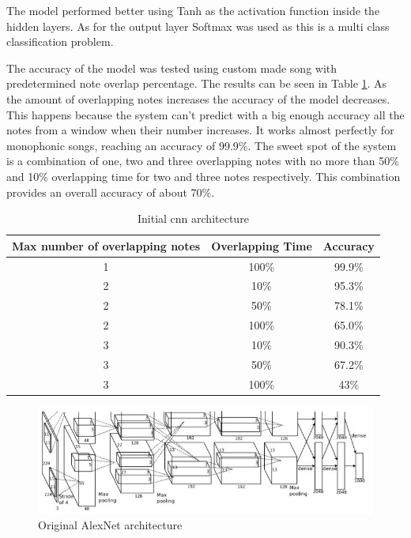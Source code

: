 The model performed better using Tanh as the activation function inside the hidden layers. As for the output layer Softmax was used as this is a multi class classification problem.

\par
The accuracy of the model was tested using custom made song with predetermined note overlap percentage. 
The results can be seen in Table \ref{table:results}. As the amount of overlapping notes increases the accuracy of the model decreases. This happens because the system can't predict with a big enough accuracy all the notes from a window when their number increases. It works almost perfectly for monophonic songs, reaching an accuracy of 99.9\%. The sweet spot of the system is a combination of one, two and three overlapping notes with no more than 50\% and 10\% overlapping time for two and three notes respectively. This combination provides an overall accuracy of about 70\%.

\begin{table} [H]
	\centering
	\caption{Initial cnn architecture}
	\begin{tabular}{ |c|c|c|} 
		\hline
		Max number of overlapping notes & Overlapping Time & Accuracy\\ \hline
		1 & 100\% & 99.9\%  \\ \hline
		2 & 10\% & 95.3\% \\ \hline
		2 & 50\% & 78.1\% \\ \hline
		2 & 100\% & 65.0\% \\ \hline
		3 & 10\% & 90.3\% \\ \hline
		3 & 50\% & 67.2\% \\ \hline
		3 & 100\% & 43\% \\ \hline				
	\end{tabular}
	\label{table:results}
\end{table}

\begin{figure}[H]
	\caption[AlexNet Architecture]{ Original AlexNet architecture \cite{alexnet}}
	\centering
	\label{fig:alexnet}
	\includegraphics[width=1\textwidth, height=\textheight, keepaspectratio]{"resources/alexnet"}
\end{figure}

